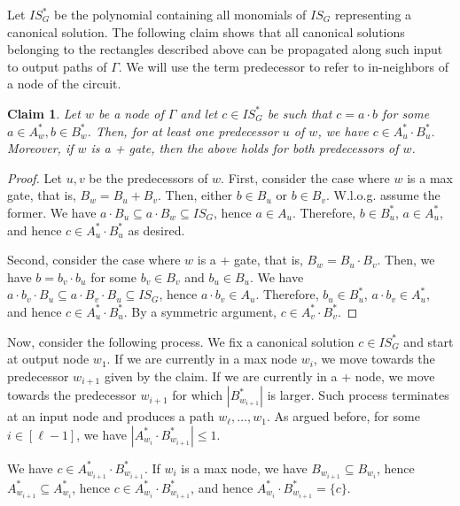\documentclass[11pt,a4paper]{article}
\newtheorem{claim}[lemma]{Claim}
\begin{document}
Let $IS_G^*$ be the polynomial containing all monomials of $IS_G$ representing a canonical solution. The following claim shows that all canonical solutions belonging to the rectangles described above can be propagated along such input to output paths of $\Gamma$. We will use the term predecessor to refer to in-neighbors of a node of the circuit.

\begin{claim}
	Let $w$ be a node of $\Gamma$ and let $c \in IS_G^*$ be such that $c = a \cdot b$ for some $a \in A_w^*, b \in B_w^*$.
	Then, for at least one predecessor $u$ of $w$, we have $c \in A_u^* \cdot B_u^*$.
	Moreover, if $w$ is a + gate, then the above holds for both predecessors of $w$.
\end{claim}

\begin{proof}
	Let $u, v$ be the predecessors of $w$.
	First, consider the case where $w$ is a max gate, that is, $B_w = B_u + B_v$. Then, either $b \in B_u$ or $b \in B_v$. W.l.o.g. assume the former.
    We have $a \cdot B_u \subseteq a \cdot B_w \subseteq IS_G$, hence $a \in A_u$. Therefore, $b \in B_u^*$, $a \in A_u^*$, and hence $c \in A_u^* \cdot B_u^*$ as desired.
    
	Second, consider the case where $w$ is a + gate, that is, $B_w = B_u \cdot B_v$. Then, we have $b = b_v \cdot b_u$ for some $b_v \in B_v$ and $b_u \in B_u$.
    We have $a \cdot b_v \cdot B_u \subseteq a \cdot B_v \cdot B_u \subseteq IS_G$, hence $a \cdot b_v \in A_u$. Therefore, $b_u \in B_u^*$, $a \cdot b_v \in A_u^*$, and hence $c \in A_u^* \cdot B_u^*$. By a symmetric argument, $c \in A_v^* \cdot B_v^*$.
\end{proof}


Now, consider the following process. We fix a canonical solution $c \in IS_G^*$ and start at output node $w_1$. If we are currently in a max node $w_i$, we move towards the predecessor $w_{i+1}$ given by the claim. If we are currently in a + node, we move towards the predecessor $w_{i+1}$ for which $|B_{w_{i+1}}^*|$ is larger. Such process terminates at an input node and produces a path $w_\ell, \dots, w_1$. As argued before, for some $i \in [\ell - 1]$, we have $|A_{w_i}^* \cdot B_{w_{i+1}}^*| \leq 1$.

We have $c \in A_{w_{i+1}}^* \cdot B_{w_{i+1}}^*$. If $w_i$ is a max node, we have $B_{w_{i+1}} \subseteq B_{w_i}$, hence $A_{w_{i+1}}^* \subseteq A_{w_i}^*$, hence $c \in A_{w_i}^* \cdot B_{w_{i+1}}^*$, and hence $A_{w_i}^* \cdot B_{w_{i+1}}^* = \{c\}$.
\end{document}
